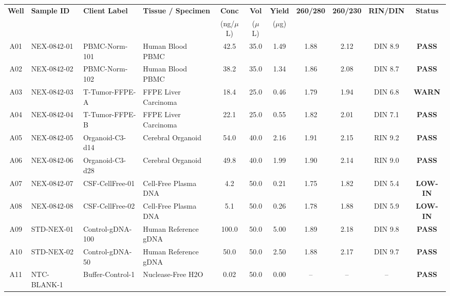 \documentclass[10pt,a4paper]{article}
\newcommand{\statusbadge}[2]{%
  \setlength{\fboxsep}{2pt}%
  \colorbox{#1!15!white}{\color{#1}\fontsize{6.5pt}{7.5pt}\selectfont\textbf{#2}}%
}
\begin{document}
\fontsize{7.5pt}{9.5pt}\selectfont
{}
\begin{tabularx}{\linewidth}{@{} c l l X c c c c c c c @{}}
  \rowcolor{PrimaryBlue}
  \color{white}\textbf{Well} & \color{white}\textbf{Sample ID} & \color{white}\textbf{Client Label} & \color{white}\textbf{Tissue / Specimen} & \color{white}\textbf{Conc} & \color{white}\textbf{Vol} & \color{white}\textbf{Yield} & \color{white}\textbf{260/280} & \color{white}\textbf{260/230} & \color{white}\textbf{RIN/DIN} & \color{white}\textbf{Status} \\
  \rowcolor{PrimaryBlue}
  & & & & \color{white}(ng/$\mu$L) & \color{white}($\mu$L) & \color{white}($\mu$g) & & & & \\
  \hline
  A01 & NEX-0842-01 & PBMC-Norm-101 & Human Blood PBMC & 42.5 & 35.0 & 1.49 & 1.88 & 2.12 & DIN 8.9 & \statusbadge{PassGreen}{PASS} \\
  A02 & NEX-0842-02 & PBMC-Norm-102 & Human Blood PBMC & 38.2 & 35.0 & 1.34 & 1.86 & 2.08 & DIN 8.7 & \statusbadge{PassGreen}{PASS} \\
  A03 & NEX-0842-03 & T-Tumor-FFPE-A & FFPE Liver Carcinoma & 18.4 & 25.0 & 0.46 & 1.79 & 1.94 & DIN 6.8 & \statusbadge{WarnAmber}{WARN} \\
  A04 & NEX-0842-04 & T-Tumor-FFPE-B & FFPE Liver Carcinoma & 22.1 & 25.0 & 0.55 & 1.82 & 2.01 & DIN 7.1 & \statusbadge{PassGreen}{PASS} \\
  A05 & NEX-0842-05 & Organoid-C3-d14 & Cerebral Organoid & 54.0 & 40.0 & 2.16 & 1.91 & 2.15 & RIN 9.2 & \statusbadge{PassGreen}{PASS} \\
  A06 & NEX-0842-06 & Organoid-C3-d28 & Cerebral Organoid & 49.8 & 40.0 & 1.99 & 1.90 & 2.14 & RIN 9.0 & \statusbadge{PassGreen}{PASS} \\
  A07 & NEX-0842-07 & CSF-CellFree-01 & Cell-Free Plasma DNA & 4.2 & 50.0 & 0.21 & 1.75 & 1.82 & DIN 5.4 & \statusbadge{WarnAmber}{LOW-IN} \\
  A08 & NEX-0842-08 & CSF-CellFree-02 & Cell-Free Plasma DNA & 5.1 & 50.0 & 0.26 & 1.78 & 1.88 & DIN 5.9 & \statusbadge{WarnAmber}{LOW-IN} \\
  A09 & STD-NEX-01 & Control-gDNA-100 & Human Reference gDNA & 100.0 & 50.0 & 5.00 & 1.89 & 2.18 & DIN 9.8 & \statusbadge{PassGreen}{PASS} \\
  A10 & STD-NEX-02 & Control-gDNA-50 & Human Reference gDNA & 50.0 & 50.0 & 2.50 & 1.88 & 2.17 & DIN 9.7 & \statusbadge{PassGreen}{PASS} \\
  A11 & NTC-BLANK-1 & Buffer-Control-1 & Nuclease-Free H2O & 0.02 & 50.0 & 0.00 & -- & -- & -- & \statusbadge{PassGreen}{PASS} \\

\end{tabularx}
\end{document}
